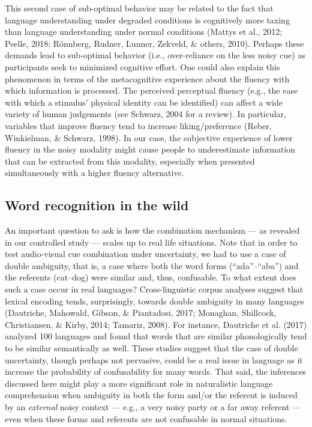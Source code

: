\documentclass[english,,man,floatsintext]{apa6}
\theoremstyle{definition}
\theoremstyle{definition}
\theoremstyle{definition}
\theoremstyle{remark}
\begin{document}
This second case of sub-optimal behavior may be related to the fact that
language understanding under degraded conditions is cognitively more
taxing than language understanding under normal conditions (Mattys et
al., 2012; Peelle, 2018; Rönnberg, Rudner, Lunner, Zekveld, \& others,
2010). Perhaps these demands lead to sub-optimal behavior (i.e.,
over-reliance on the less noisy cue) as participants seek to minimized
cognitive effort. One could also explain this phenomenon in terms of the
metacognitive experience about the fluency with which information is
processed. The perceived perceptual fluency (e.g., the ease with which a
stimulus' physical identity can be identified) can affect a wide variety
of human judgements (see Schwarz, 2004 for a review). In particular,
variables that improve fluency tend to increase liking/preference
(Reber, Winkielman, \& Schwarz, 1998). In our case, the subjective
experience of lower fluency in the noisy modality might cause people to
underestimate information that can be extracted from this modality,
especially when presented simultaneously with a higher fluency
alternative.

\subsection{Word recognition in the
wild}\label{word-recognition-in-the-wild}

An important question to ask is how the combination mechanism --- as
revealed in our controlled study --- scales up to real life situations.
Note that in order to test audio-visual cue combination under
uncertainty, we had to use a case of double ambiguity, that is, a case
where both the word forms (\enquote{ada}--\enquote{aba}) and the
referents (cat--dog) were similar and, thus, confusable. To what extent
does such a case occur in real languages? Cross-linguistic corpus
analyses suggest that lexical encoding tends, surprisingly, towards
double ambiguity in many languages (Dautriche, Mahowald, Gibson, \&
Piantadosi, 2017; Monaghan, Shillcock, Christiansen, \& Kirby, 2014;
Tamariz, 2008). For instance, Dautriche et al. (2017) analyzed 100
languages and found that words that are similar phonologically tend to
be similar semantically as well. These studies suggest that the case of
double uncertainty, though perhaps not pervasive, could be a real issue
in language as it increase the probability of confusability for many
words. That said, the inferences discussed here might play a more
significant role in naturalistic language comprehension when ambiguity
in both the form and/or the referent is induced by an \emph{external}
noisy context --- e.g., a very noisy party or a far away referent ---
even when these forms and referents are not confusable in normal
situations.
\end{document}
